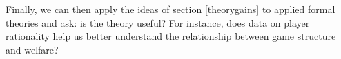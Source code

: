\documentclass[
  12pt,
]{book}
\begin{document}
Finally, we can then apply the ideas of section \ref{theorygains} to applied formal theories and ask: is the theory useful? For instance, does data on player rationality help us better understand the relationship between game structure and welfare?

  
\end{document}
